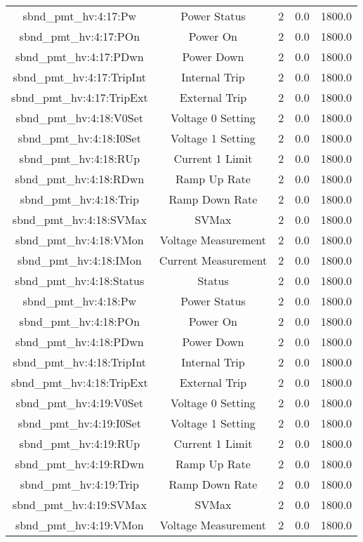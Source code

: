 \begin{table}[ptb]
\begin{tabular}{c | c c c c}
sbnd_pmt_hv:4:17:Pw & Power Status & 2 & 0.0 & 1800.0\\ 
sbnd_pmt_hv:4:17:POn & Power On & 2 & 0.0 & 1800.0\\ 
sbnd_pmt_hv:4:17:PDwn & Power Down & 2 & 0.0 & 1800.0\\ 
sbnd_pmt_hv:4:17:TripInt & Internal Trip & 2 & 0.0 & 1800.0\\ 
sbnd_pmt_hv:4:17:TripExt & External Trip & 2 & 0.0 & 1800.0\\ 
sbnd_pmt_hv:4:18:V0Set & Voltage 0 Setting & 2 & 0.0 & 1800.0\\ 
sbnd_pmt_hv:4:18:I0Set & Voltage 1 Setting & 2 & 0.0 & 1800.0\\ 
sbnd_pmt_hv:4:18:RUp & Current 1 Limit & 2 & 0.0 & 1800.0\\ 
sbnd_pmt_hv:4:18:RDwn & Ramp Up Rate & 2 & 0.0 & 1800.0\\ 
sbnd_pmt_hv:4:18:Trip & Ramp Down Rate & 2 & 0.0 & 1800.0\\ 
sbnd_pmt_hv:4:18:SVMax & SVMax & 2 & 0.0 & 1800.0\\ 
sbnd_pmt_hv:4:18:VMon & Voltage Measurement & 2 & 0.0 & 1800.0\\ 
sbnd_pmt_hv:4:18:IMon & Current Measurement & 2 & 0.0 & 1800.0\\ 
sbnd_pmt_hv:4:18:Status & Status & 2 & 0.0 & 1800.0\\ 
sbnd_pmt_hv:4:18:Pw & Power Status & 2 & 0.0 & 1800.0\\ 
sbnd_pmt_hv:4:18:POn & Power On & 2 & 0.0 & 1800.0\\ 
sbnd_pmt_hv:4:18:PDwn & Power Down & 2 & 0.0 & 1800.0\\ 
sbnd_pmt_hv:4:18:TripInt & Internal Trip & 2 & 0.0 & 1800.0\\ 
sbnd_pmt_hv:4:18:TripExt & External Trip & 2 & 0.0 & 1800.0\\ 
sbnd_pmt_hv:4:19:V0Set & Voltage 0 Setting & 2 & 0.0 & 1800.0\\ 
sbnd_pmt_hv:4:19:I0Set & Voltage 1 Setting & 2 & 0.0 & 1800.0\\ 
sbnd_pmt_hv:4:19:RUp & Current 1 Limit & 2 & 0.0 & 1800.0\\ 
sbnd_pmt_hv:4:19:RDwn & Ramp Up Rate & 2 & 0.0 & 1800.0\\ 
sbnd_pmt_hv:4:19:Trip & Ramp Down Rate & 2 & 0.0 & 1800.0\\ 
sbnd_pmt_hv:4:19:SVMax & SVMax & 2 & 0.0 & 1800.0\\ 
sbnd_pmt_hv:4:19:VMon & Voltage Measurement & 2 & 0.0 & 1800.0\\ 

\end{tabular}
\end{table}

